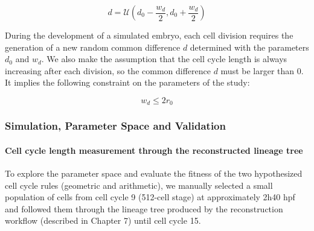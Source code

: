 $$d = \mathcal{U}(d_0 - \frac{w_d}{2}, d_0 + \frac{w_d}{2})$$

During the development of a simulated embryo, each cell division requires the generation of a new random common difference $d$ determined with the parameters $d_0$ and $w_d$. We also make the assumption that the cell cycle length is always increasing after each division, so the common difference $d$ must be larger than 0. It implies the following constraint on the parameters of the study:

$$w_d \leq 2 r_0$$


\subsubsection{Simulation, Parameter Space and Validation}


\paragraph{Cell cycle length measurement through the reconstructed lineage tree}


To explore the parameter space and evaluate the fitness of the two hypothesized cell cycle rules (geometric and arithmetic), we manually selected a small population of cells from cell cycle 9 (512-cell stage) at approximately 2h40 hpf and followed them through the lineage tree produced by the reconstruction workflow (described in Chapter 7) until cell cycle 15.


